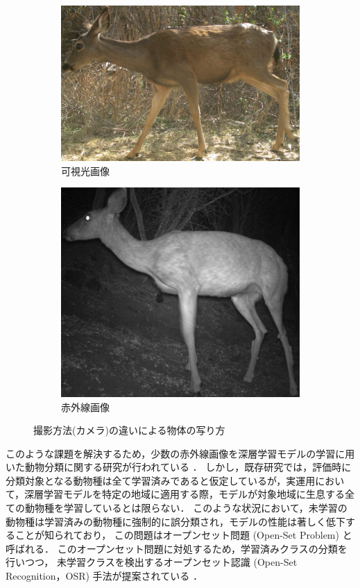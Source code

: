 \begin{figure}[tbp]
  \centering
  \begin{subfigure}[b]{0.45\linewidth}
    \centering
    \includegraphics[height=0.7\linewidth, keepaspectratio]{image/cct_color_deer.png}
    \caption{可視光画像}
    \label{fig:color_deer}
  \end{subfigure}
  \hfill
  \begin{subfigure}[b]{0.45\linewidth}
    \centering
    \includegraphics[height=0.7\linewidth, keepaspectratio]{image/cct_infrared_deer.png}
    \caption{赤外線画像}
    \label{fig:infrared_deer}
  \end{subfigure}
  \caption{撮影方法(カメラ)の違いによる物体の写り方}
  \label{fig:camera}
\end{figure}

このような課題を解決するため，少数の赤外線画像を深層学習モデルの学習に用いた動物分類に関する研究が行われている \cite{kishimoto2023}．
しかし，既存研究では，評価時に分類対象となる動物種は全て学習済みであると仮定しているが，実運用において，深層学習モデルを特定の地域に適用する際，モデルが対象地域に生息する全ての動物種を学習しているとは限らない．
このような状況において，未学習の動物種は学習済みの動物種に強制的に誤分類され，モデルの性能は著しく低下することが知られており，
この問題はオープンセット問題 (Open-Set Problem) \cite{osr} と呼ばれる．
このオープンセット問題に対処するため，学習済みクラスの分類を行いつつ，
未学習クラスを検出するオープンセット認識 (Open-Set Recognition，OSR) 手法が提案されている \cite{sun2020, sagar2022}．

